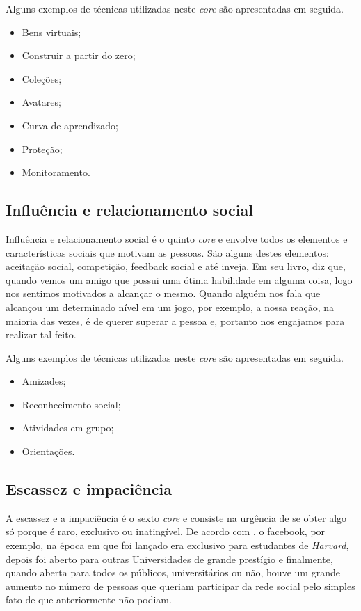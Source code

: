 Alguns exemplos de técnicas utilizadas neste \textit{core} são apresentadas em seguida.

\begin{itemize}
	\item Bens virtuais;
	\item Construir a partir do zero;
	\item Coleções;
	\item Avatares;
	\item Curva de aprendizado;
	\item Proteção;
	\item Monitoramento.
\end{itemize}


\subsection{Influência e relacionamento social}
Influência e relacionamento social é o quinto \textit{core} e envolve todos os elementos e características sociais que 
motivam as pessoas. São alguns destes elementos: aceitação social, competição, feedback social e até inveja. Em seu livro,
 diz que, quando vemos um amigo que possui uma ótima habilidade em alguma coisa, logo nos sentimos
motivados a alcançar o mesmo. Quando alguém nos fala que alcançou um determinado nível em um jogo, por exemplo, a nossa reação, na maioria das 
vezes, é de querer superar a pessoa e, portanto nos engajamos para realizar tal feito.

Alguns exemplos de técnicas utilizadas neste \textit{core} são apresentadas em seguida.

\begin{itemize}
	\item Amizades;
	\item Reconhecimento social;
	\item Atividades em grupo;
	\item Orientações.
\end{itemize}


\subsection{Escassez e impaciência}
A escassez e a impaciência é o sexto \textit{core} e consiste na urgência de se obter algo só porque é raro, exclusivo ou inatingível. De 
acordo com , o facebook, por exemplo, na época em que foi lançado era exclusivo para estudantes de \textit{Harvard}, 
depois foi aberto para outras Universidades de grande prestígio e finalmente, quando aberta para todos os públicos, universitários ou não, 
houve um grande aumento no número de pessoas que queriam participar da rede social pelo simples fato de que anteriormente não podiam.


